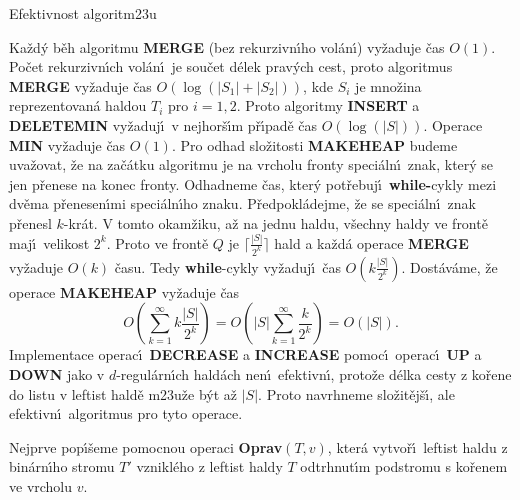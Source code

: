 \subhead
Efektivnost algoritm\accent23u
\endsubhead 
\smallskip

\flushpar Ka\v zd\'y b\v eh algoritmu {\bf MERGE} (bez rekurzivn\'\i ho vol\'an\'\i ) 
vy\v zaduje \v cas $O(1)$. Po\v cet rekurzivn\'\i ch vol\'an\'\i\ je 
sou\v cet d\'elek prav\'ych cest, proto algoritmus {\bf MERGE} vy\v zaduje 
\v cas $O(\log(|S_1|+|S_2|))$, 
kde $S_i$ je mno\v zina reprezentovan\'a haldou $T_i$ pro $i=1,2$.
Proto algoritmy {\bf INSERT} a {\bf DELETEMIN} vy\v zaduj\'\i\ v 
nejhor\v s\'\i m p\v r\'\i pad\v e \v cas $O(\log(|S|))$. Ope\-race {\bf MIN} vy\v zaduje 
\v cas $O(1)$. Pro odhad slo\v zitosti {\bf MA\-KEHEAP} budeme 
uva\v zovat, \v ze na za\v c\'atku algoritmu je na vrcholu fronty 
speci\'aln\'\i\ znak, kter\'y se jen p\v renese na konec fronty. 
Odhadneme \v cas, kter\'y pot\v rebuj\'\i\ {\bf while-}cykly mezi dv\v e\-ma 
p\v renesen\'\i mi speci\'aln\'\i ho znaku. P\v redpokl\'adejme, \v ze se 
spe\-ci\'al\-n\'\i\ znak p\v renesl $k$-kr\'at. V tomto okam\v ziku, a\v z na 
jednu haldu, v\v sechny haldy ve front\v e maj\'\i\ velikost $2^k$. 
Proto ve front\v e $Q$ je $\big\lceil\frac {|S|}{2^k}\big\rceil$ hald a ka\v zd\'a operace 
{\bf MERGE} vy\v zadu\-je $O(k)$ \v casu. Tedy {\bf while}-cykly vy\v zaduj\'\i\ 
\v cas $O(k\frac {|S|}{2^k})$. Dost\'a\-v\'a\-me, \v ze ope\-race {\bf MAKEHEAP} vy\v zaduje \v cas 
$$O(\sum_{k=1}^{\infty}k\frac {|S|}{2^k})=O(|S|\sum_{k=1}^{\infty}\frac 
k{2^k})=O(|S|).$$
Implementace operac\'\i\ {\bf DECREASE} a {\bf INCREASE} pomoc\'\i\ 
operac\'\i\ {\bf UP} a {\bf DOWN} jako v $d$-regul\'arn\'\i ch hald\'ach nen\'\i\ 
efektivn\'\i , proto\v ze d\'elka cesty z ko\v rene do listu v leftist 
hald\v e m\accent23u\v ze b\'yt a\v z $|S|$. Proto navrhneme 
slo\v zit\v ej\v s\'\i , ale efektivn\'\i\ algoritmus pro tyto operace.
\medskip

\flushpar Nejprve pop\'\i\v seme pomocnou operaci {\bf Oprav$(T,v
)$}, 
kter\'a vy\-tvo\-\v r\'\i\ lef\-tist haldu z bin\'arn\'\i ho stromu $
T'$ vznikl\'eho z 
leftist haldy $T$ odtrhnut\'\i m podstromu s ko\v renem ve vrcholu $
v$.
\bigskip

